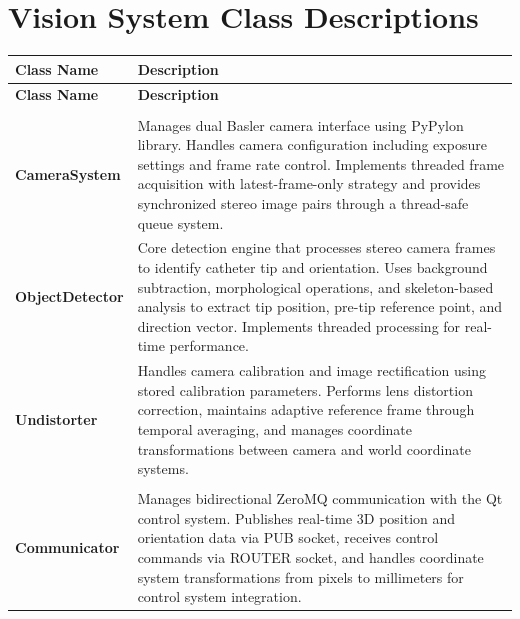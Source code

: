 \section{Vision System Class Descriptions}
\begin{longtable}{|>{\raggedright\arraybackslash}p{}|>{\raggedright\arraybackslash}p{}|}
\toprule
\textbf{Class Name} & \textbf{Description} \\
\midrule
\endfirsthead

\toprule
\textbf{Class Name} & \textbf{Description} \\
\midrule
\endhead

\bottomrule
\endfoot

\bottomrule
\endlastfoot

\rowcolor{folderblue}
\multicolumn{2}{|c|}{\textcolor{white}{\textbf{\large  Core Vision System}}} \\
\midrule
\cellcolor{lightblue}\textbf{CameraSystem} & Manages dual Basler camera interface using PyPylon library. Handles camera configuration including exposure settings and frame rate control. Implements threaded frame acquisition with latest-frame-only strategy and provides synchronized stereo image pairs through a thread-safe queue system. \\
\hline
\cellcolor{lightblue}\textbf{ObjectDetector} & Core detection engine that processes stereo camera frames to identify catheter tip and orientation. Uses background subtraction, morphological operations, and skeleton-based analysis to extract tip position, pre-tip reference point, and direction vector. Implements threaded processing for real-time performance. \\
\hline
\cellcolor{lightblue}\textbf{Undistorter} & Handles camera calibration and image rectification using stored calibration parameters. Performs lens distortion correction, maintains adaptive reference frame through temporal averaging, and manages coordinate transformations between camera and world coordinate systems. \\
\midrule

\rowcolor{folderblue}
\multicolumn{2}{|c|}{\textcolor{white}{\textbf{\large  Communication \& Control}}} \\
\midrule
\cellcolor{lightblue}\textbf{Communicator} & Manages bidirectional ZeroMQ communication with the Qt control system. Publishes real-time 3D position and orientation data via PUB socket, receives control commands via ROUTER socket, and handles coordinate system transformations from pixels to millimeters for control system integration. \\
\midrule


\end{longtable}

